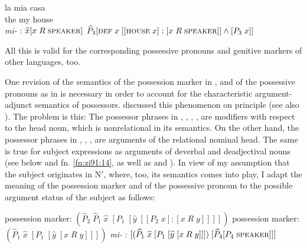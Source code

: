\documentclass[output=paper,colorlinks,citecolor=brown]{langscibook}
\begin{document}
\ea \label{ex:zi91:32}
    \gll la mia casa \\
    the my house \\
    \glt
\ex \label{ex:zi91:33} \textit{mi-} : $\widehat{x}[x \; R  \; \textsc{speaker}]$
\ex \label{ex:zi91:34} $\widehat{P}_{3}[\textsc{def} \; x \; [[ \textsc{house} \; x]:[x \; R \; \textsc{speaker}]] \wedge [P_{3} \; x]]$
\z

\noindent All this is valid for the corresponding possessive pronouns and genitive markers of other languages, too.

One revision of the semantics of the possession marker in ,  and of the possessive pronouns as in  is necessary in order to account for the characteristic argument-adjunct semantics of possessors. \citet{Grimshaw88Adjuncts-and} discussed this phenomenon on principle (see also \citealt{Anderson83Prenominal-genitive}). The problem is this: The possessor phrases in , , , ,  are modifiers with respect to the head noun, which is nonrelational in its semantics. On the other hand, the possessor phrases in , , ,  are arguments of the relational nominal head. The same is true for subject expressions as arguments of deverbal and deadjectival nouns (see below and fn. \ref{fn:zi91:14}, as well as \citet{Huste89Zur-Syntax} and \citet{Bischof91Sachverhaltsbezeichnungen-des}). In view of my assumption that the subject originates in N$'$, where, too, its semantics comes into play, I adapt the meaning of the possession marker and of the possessive pronoun to the possible argument status of the subject as follows:

\begin{exe}
     \label{ex:zi91:20p} possession marker: $(\widehat{P}_{2} \;{\widehat{P}}_{1} \; \widehat{x} \; [{P}_{1} \; [\widehat{y} \; [[P_{2} \; x] : [x \; R \; y]]]])$
     \label{ex:zi91:30apB} possession marker: $({\widehat{P}}_{1} \; \widehat{x} \; [{P}_{1} \; [\widehat{y} \; [x \; R \; y]]])$
     \label{ex:zi91:33p} \textit{mi-} : $[({\widehat{P}}_{1} \; \widehat{x} \; [{P}_{1} \; [\widehat{y} \; [x \; R \; y]]]) \; [{\widehat{P}}_{4}[P_{4} \; \textsc{speaker}]]]$
\end{exe}
\end{document}
